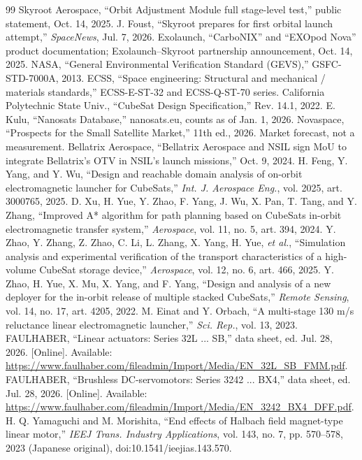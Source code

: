 \documentclass[conference]{IEEEtran}
\begin{document}
\begin{thebibliography}{99}
 Skyroot Aerospace, ``Orbit Adjustment Module full stage-level test,'' public statement, Oct. 14, 2025.
 J. Foust, ``Skyroot prepares for first orbital launch attempt,'' \emph{SpaceNews}, Jul. 7, 2026.
 Exolaunch, ``CarboNIX'' and ``EXOpod Nova'' product documentation; Exolaunch--Skyroot partnership announcement, Oct. 14, 2025.
 NASA, ``General Environmental Verification Standard (GEVS),'' GSFC-STD-7000A, 2013.
 ECSS, ``Space engineering: Structural and mechanical / materials standards,'' ECSS-E-ST-32 and ECSS-Q-ST-70 series.
 California Polytechnic State Univ., ``CubeSat Design Specification,'' Rev. 14.1, 2022.
 E. Kulu, ``Nanosats Database,'' nanosats.eu, counts as of Jan. 1, 2026.
 Novaspace, ``Prospects for the Small Satellite Market,'' 11th ed., 2026. Market forecast, not a measurement.
 Bellatrix Aerospace, ``Bellatrix Aerospace and NSIL sign MoU to integrate Bellatrix's OTV in NSIL's launch missions,'' Oct. 9, 2024.
 H. Feng, Y. Yang, and Y. Wu, ``Design and reachable domain analysis of on-orbit electromagnetic launcher for CubeSats,'' \emph{Int. J. Aerospace Eng.}, vol. 2025, art. 3000765, 2025.
 D. Xu, H. Yue, Y. Zhao, F. Yang, J. Wu, X. Pan, T. Tang, and Y. Zhang, ``Improved A* algorithm for path planning based on CubeSats in-orbit electromagnetic transfer system,'' \emph{Aerospace}, vol. 11, no. 5, art. 394, 2024.
 Y. Zhao, Y. Zhang, Z. Zhao, C. Li, L. Zhang, X. Yang, H. Yue, \emph{et al.}, ``Simulation analysis and experimental verification of the transport characteristics of a high-volume CubeSat storage device,'' \emph{Aerospace}, vol. 12, no. 6, art. 466, 2025.
 Y. Zhao, H. Yue, X. Mu, X. Yang, and F. Yang, ``Design and analysis of a new deployer for the in-orbit release of multiple stacked CubeSats,'' \emph{Remote Sensing}, vol. 14, no. 17, art. 4205, 2022.
 M. Einat and Y. Orbach, ``A multi-stage 130 m/s reluctance linear electromagnetic launcher,'' \emph{Sci. Rep.}, vol. 13, 2023.
 FAULHABER, ``Linear actuators: Series 32L ... SB,'' data sheet, ed. Jul. 28, 2026. [Online]. Available: \url{https://www.faulhaber.com/fileadmin/Import/Media/EN_32L_SB_FMM.pdf}.
 FAULHABER, ``Brushless DC-servomotors: Series 3242 ... BX4,'' data sheet, ed. Jul. 28, 2026. [Online]. Available: \url{https://www.faulhaber.com/fileadmin/Import/Media/EN_3242_BX4_DFF.pdf}.
 H. Q. Yamaguchi and M. Morishita, ``End effects of Halbach field magnet-type linear motor,'' \emph{IEEJ Trans. Industry Applications}, vol. 143, no. 7, pp. 570--578, 2023 (Japanese original), doi:10.1541/ieejias.143.570.

\end{thebibliography}
\end{document}
